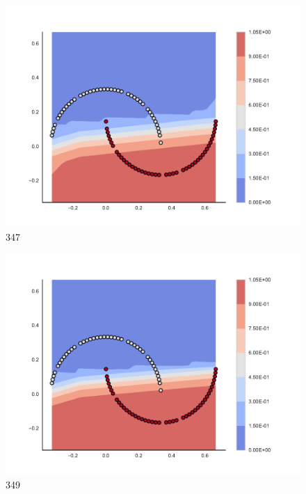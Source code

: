 \begin{subfigure}[b]{0.09\textwidth}
    \includegraphics[clip, trim=2.35cm 1.75cm 4.5cm 0cm,width=\textwidth]{img/convergence/347.pdf}
    \caption{347}
    \label{fig:convergence_347}
\end{subfigure}
%
\begin{subfigure}[b]{0.09\textwidth}
    \includegraphics[clip, trim=2.35cm 1.75cm 4.5cm 0cm,width=\textwidth]{img/convergence/349.pdf}
    \caption{349}
    \label{fig:convergence_349}
\end{subfigure}
%
